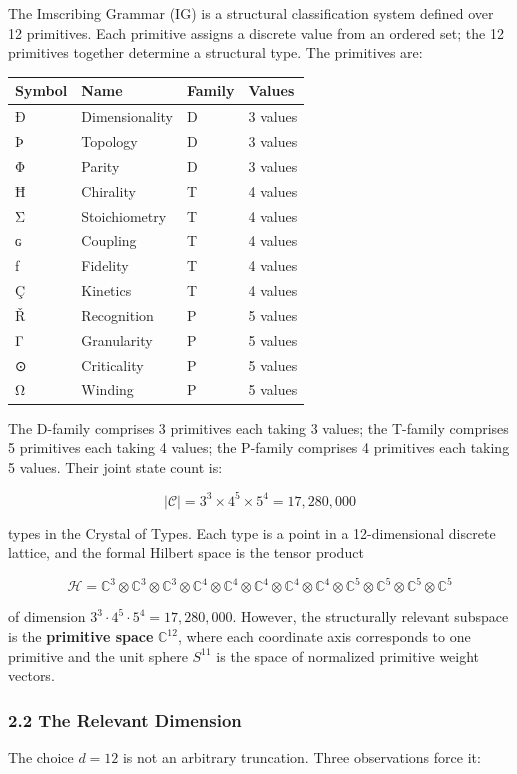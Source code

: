 The Imscribing Grammar (IG) is a structural classification system
defined over 12 primitives. Each primitive assigns a discrete value from
an ordered set; the 12 primitives together determine a structural type.
The primitives are:

\begin{longtable}[]{@{}llll@{}}
\toprule
Symbol & Name & Family & Values\tabularnewline
\midrule
\endhead
Ð & Dimensionality & D & 3 values\tabularnewline
Þ & Topology & D & 3 values\tabularnewline
Φ & Parity & D & 3 values\tabularnewline
Ħ & Chirality & T & 4 values\tabularnewline
Σ & Stoichiometry & T & 4 values\tabularnewline
ɢ & Coupling & T & 4 values\tabularnewline
ƒ & Fidelity & T & 4 values\tabularnewline
Ç & Kinetics & T & 4 values\tabularnewline
Ř & Recognition & P & 5 values\tabularnewline
Γ & Granularity & P & 5 values\tabularnewline
⊙ & Criticality & P & 5 values\tabularnewline
Ω & Winding & P & 5 values\tabularnewline
\bottomrule
\end{longtable}

The D-family comprises 3 primitives each taking 3 values; the T-family
comprises 5 primitives each taking 4 values; the P-family comprises 4
primitives each taking 5 values. Their joint state count is:

\[|\mathcal{C}| = 3^3 \times 4^5 \times 5^4 = 17{,}280{,}000\]

types in the Crystal of Types. Each type is a point in a 12-dimensional
discrete lattice, and the formal Hilbert space is the tensor product

\[\mathcal{H} = \mathbb{C}^3 \otimes \mathbb{C}^3 \otimes \mathbb{C}^3 \otimes \mathbb{C}^4 \otimes \mathbb{C}^4 \otimes \mathbb{C}^4 \otimes \mathbb{C}^4 \otimes \mathbb{C}^4 \otimes \mathbb{C}^5 \otimes \mathbb{C}^5 \otimes \mathbb{C}^5 \otimes \mathbb{C}^5\]

of dimension \(3^3 \cdot 4^5 \cdot 5^4 = 17{,}280{,}000\). However, the
structurally relevant subspace is the \textbf{primitive space}
\(\mathbb{C}^{12}\), where each coordinate axis corresponds to one
primitive and the unit sphere \(S^{11}\) is the space of normalized
primitive weight vectors.

\hypertarget{the-relevant-dimension}{%
\subsubsection{2.2 The Relevant
Dimension}\label{the-relevant-dimension}}

The choice \(d = 12\) is not an arbitrary truncation. Three observations
force it:

